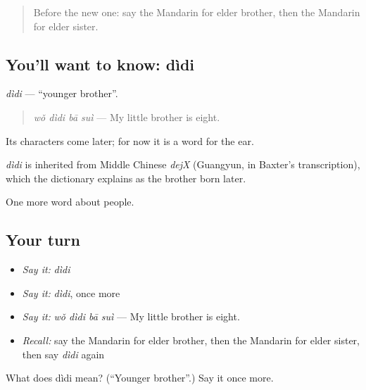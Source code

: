 \label{lesson:ZH-C32-didi}



\begin{quote}
Before the new one: say the Mandarin for elder brother, then the Mandarin for elder sister.
\end{quote}

\subsection*{You'll want to know: dìdi}
\emph{dìdi} — \textquotedblleft{}younger brother\textquotedblright{}.

\begin{quote}
\emph{wǒ dìdi bā suì} — My little brother is eight.
\end{quote}

Its characters come later; for now it is a word for the ear.

\begin{cousinweb}
\emph{dìdi} is inherited from Middle Chinese \emph{dejX} (Guangyun, in Baxter's transcription), which the dictionary explains as the brother born later.
\end{cousinweb}

\begin{grammarlens}[title={What you've built}]
One more word about people.
\end{grammarlens}

\subsection*{Your turn}
\begin{itemize}
\raggedright
  \item \emph{Say it:} \emph{dìdi}
  \item \emph{Say it:} \emph{dìdi}, once more
  \item \emph{Say it:} \emph{wǒ dìdi bā suì} — My little brother is eight.
  \item \emph{Recall:} say the Mandarin for elder brother, then the Mandarin for elder sister, then say \emph{dìdi} again
\end{itemize}

\begin{tcolorbox}[breakable,colback=teal!4,colframe=teal!35!black,title={Before you move on}]
What does dìdi mean? (\textquotedblleft{}Younger brother\textquotedblright{}.) Say it once more.
\end{tcolorbox}
